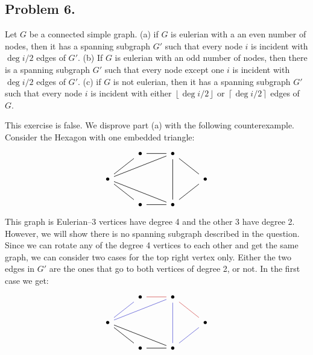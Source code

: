 \documentclass[12pt]{article}
\theoremstyle{definitionstyle}
\newcommand{\floor}[1]{\left\lfloor#1\right\rfloor}
\newcommand{\ceil}[1]{\left\lceil#1\right\rceil}
\begin{document}
    \subsection*{Problem 6.}
    Let $G$ be a connected simple graph. (a) if $G$ is eulerian with a an even number of nodes, then it has a spanning subgraph $G'$ such that every node $i$ is incident with $\deg i/2$ edges of $G'$. (b) If $G$ is eulerian with an odd number of nodes, then there is a spanning subgraph $G'$ such that every node except one $i$ is incident with $\deg i/2$ edges of $G'$. (c) if $G$ is not eulerian, then it has a spanning subgraph $G'$ such that every node $i$ is incident with either $\floor{\deg i/2}$ or $\ceil{\deg i/2}$ edges of $G$. 

    This exercise is false. We disprove part (a) with the following counterexample. Consider the Hexagon with one embedded triangle:
    \[\begin{tikzcd}
        & \bullet & \bullet \\
        \bullet &&& \bullet \\
        & \bullet & \bullet
        \arrow[no head, from=1-2, to=1-3]
        \arrow[no head, from=1-3, to=2-1]
        \arrow[no head, from=1-3, to=2-4]
        \arrow[no head, from=1-3, to=3-3]
        \arrow[no head, from=2-1, to=1-2]
        \arrow[no head, from=2-1, to=3-3]
        \arrow[no head, from=2-4, to=3-3]
        \arrow[no head, from=3-2, to=2-1]
        \arrow[no head, from=3-3, to=3-2]
    \end{tikzcd}\]
    This graph is Eulerian--3 vertices have degree 4 and the other 3 have degree 2. However, we will show there is no spanning subgraph described in the question. Since we can rotate any of the degree 4 vertices to each other and get the same graph, we can consider two cases for the top right vertex only. Either the two edges in $G'$ are the ones that go to both vertices of degree 2, or not. In the first case we get:
    \[\begin{tikzcd}
        & \bullet & \bullet \\
        \bullet &&& \bullet \\
        & \bullet & \bullet
        \arrow[color={rgb,255:red,214;green,92;blue,92}, no head, from=1-2, to=1-3]
        \arrow[color={rgb,255:red,92;green,92;blue,214}, no head, from=1-3, to=2-1]
        \arrow[color={rgb,255:red,214;green,92;blue,92}, no head, from=1-3, to=2-4]
        \arrow[color={rgb,255:red,92;green,92;blue,214}, no head, from=1-3, to=3-3]
        \arrow[color={rgb,255:red,92;green,92;blue,214}, no head, from=2-1, to=1-2]
        \arrow[no head, from=2-1, to=3-3]
        \arrow[color={rgb,255:red,92;green,92;blue,214}, no head, from=2-4, to=3-3]
        \arrow[no head, from=3-2, to=2-1]
        \arrow[no head, from=3-3, to=3-2]
    \end{tikzcd}\]
\end{document}
